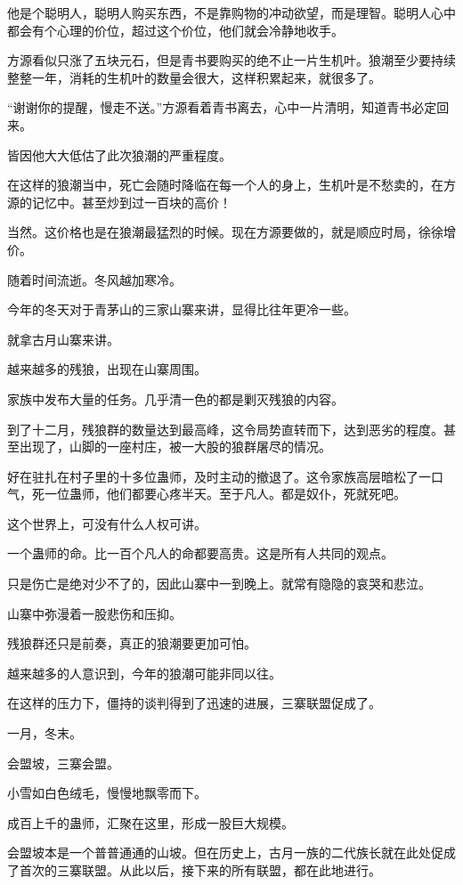 \begin{this_body}
他是个聪明人，聪明人购买东西，不是靠购物的冲动欲望，而是理智。聪明人心中都会有个心理的价位，超过这个价位，他们就会冷静地收手。

方源看似只涨了五块元石，但是青书要购买的绝不止一片生机叶。狼潮至少要持续整整一年，消耗的生机叶的数量会很大，这样积累起来，就很多了。

“谢谢你的提醒，慢走不送。”方源看着青书离去，心中一片清明，知道青书必定回来。

皆因他大大低估了此次狼潮的严重程度。

在这样的狼潮当中，死亡会随时降临在每一个人的身上，生机叶是不愁卖的，在方源的记忆中。甚至炒到过一百块的高价！

当然。这价格也是在狼潮最猛烈的时候。现在方源要做的，就是顺应时局，徐徐增价。

随着时间流逝。冬风越加寒冷。

今年的冬天对于青茅山的三家山寨来讲，显得比往年更冷一些。

就拿古月山寨来讲。

越来越多的残狼，出现在山寨周围。

家族中发布大量的任务。几乎清一色的都是剿灭残狼的内容。

到了十二月，残狼群的数量达到最高峰，这令局势直转而下，达到恶劣的程度。甚至出现了，山脚的一座村庄，被一大股的狼群屠尽的情况。

好在驻扎在村子里的十多位蛊师，及时主动的撤退了。这令家族高层暗松了一口气，死一位蛊师，他们都要心疼半天。至于凡人。都是奴仆，死就死吧。

这个世界上，可没有什么人权可讲。

一个蛊师的命。比一百个凡人的命都要高贵。这是所有人共同的观点。

只是伤亡是绝对少不了的，因此山寨中一到晚上。就常有隐隐的哀哭和悲泣。

山寨中弥漫着一股悲伤和压抑。

残狼群还只是前奏，真正的狼潮要更加可怕。

越来越多的人意识到，今年的狼潮可能非同以往。

在这样的压力下，僵持的谈判得到了迅速的进展，三寨联盟促成了。

一月，冬末。

会盟坡，三寨会盟。

小雪如白色绒毛，慢慢地飘零而下。

成百上千的蛊师，汇聚在这里，形成一股巨大规模。

会盟坡本是一个普普通通的山坡。但在历史上，古月一族的二代族长就在此处促成了首次的三寨联盟。从此以后，接下来的所有联盟，都在此地进行。


\end{this_body}
